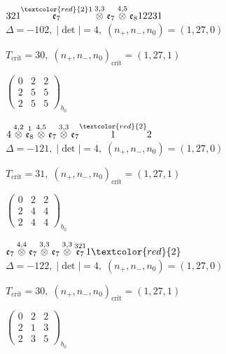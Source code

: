 \documentclass[10pt]{article}
\begin{document}
$321\overset{\textcolor{red}{2}1}{\mathfrak{e}_7}\overset{3,3}{\otimes}\mathfrak{e}_7\overset{4,5}{\otimes}\mathfrak{e}_812231$ \quad $\Delta=-102,\; |\det|=4,\; (n_+,n_-,n_0)=(1,27,0)$

\hspace{1em}$T_{\text{crit}}=30,\; (n_+,n_-,n_0)_{\text{crit}}=(1,27,1)$

\hspace{2em}$\left(\begin{smallmatrix}0 & 2 & 2 \\ 2 & 5 & 5 \\ 2 & 5 & 5\end{smallmatrix}\right)_{\!b_0}$

\smallskip

$4\overset{4,2}{\otimes}\overset{1}{\mathfrak{e}_8}\overset{4,5}{\otimes}\mathfrak{e}_7\overset{3,3}{\otimes}\mathfrak{e}_7\overset{\textcolor{red}{2}}{1}2$ \quad $\Delta=-121,\; |\det|=4,\; (n_+,n_-,n_0)=(1,27,0)$

\hspace{1em}$T_{\text{crit}}=31,\; (n_+,n_-,n_0)_{\text{crit}}=(1,27,1)$

\hspace{2em}$\left(\begin{smallmatrix}0 & 2 & 2 \\ 2 & 4 & 4 \\ 2 & 4 & 4\end{smallmatrix}\right)_{\!b_0}$

\smallskip

$\mathfrak{e}_7\overset{4,4}{\otimes}\mathfrak{e}_7\overset{3,3}{\otimes}\mathfrak{e}_7\overset{3,3}{\otimes}\overset{321}{\mathfrak{e}_7}1\textcolor{red}{2}$ \quad $\Delta=-122,\; |\det|=4,\; (n_+,n_-,n_0)=(1,27,0)$

\hspace{1em}$T_{\text{crit}}=30,\; (n_+,n_-,n_0)_{\text{crit}}=(1,27,1)$

\hspace{2em}$\left(\begin{smallmatrix}0 & 2 & 2 \\ 2 & 1 & 3 \\ 2 & 3 & 5\end{smallmatrix}\right)_{\!b_0}$
\end{document}
